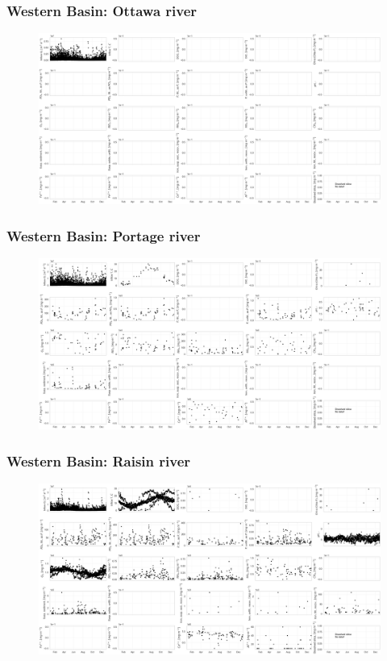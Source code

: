 \documentclass{beamer}
\begin{document}
\begin{frame}
\frametitle{Western Basin: Ottawa river}
\begin{figure}
\includegraphics[width=\textwidth]{rivers/Western basin/plot_1yr ottawariver.png}
\end{figure}
\end{frame}


\begin{frame}
\frametitle{Western Basin: Portage river}
\begin{figure}
\includegraphics[width=\textwidth]{rivers/Western basin/plot_1yr portageriver.png}
\end{figure}
\end{frame}


\begin{frame}
\frametitle{Western Basin: Raisin river}
\begin{figure}
\includegraphics[width=\textwidth]{rivers/Western basin/plot_1yr riverraisin.png}
\end{figure}
\end{frame}
\end{document}
